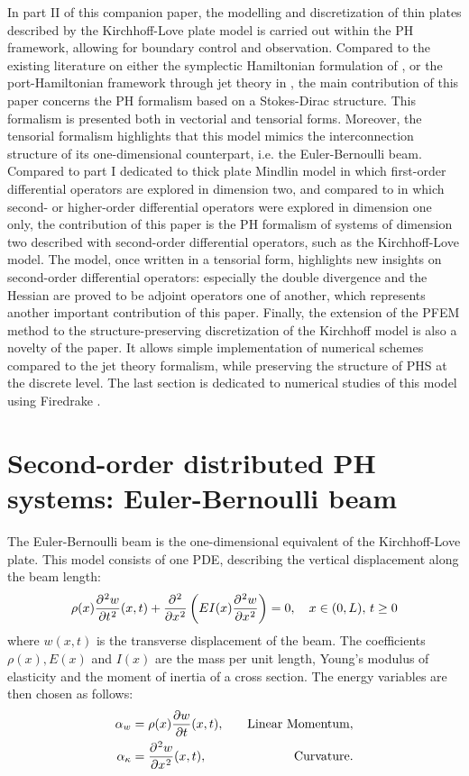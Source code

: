 \documentclass[preprint,12pt]{elsarticle}
\begin{document}
In part II of this companion paper, the modelling and discretization of thin plates described by the Kirchhoff-Love plate model is carried out within the PH framework, allowing for boundary control and observation. Compared to the existing literature on either the symplectic Hamiltonian formulation of  \cite{LI2016984,LI2018310}, or the port-Hamiltonian framework through jet theory in {\cite{jetMin,jetKirchh}}, the main contribution of this paper concerns the PH formalism based on a Stokes-Dirac structure. This formalism is presented both in vectorial and tensorial forms.  Moreover, the tensorial formalism \cite[Chapter~16]{Grinfield} highlights that this model mimics the interconnection structure of its one-dimensional counterpart, i.e. the Euler-Bernoulli beam. Compared to part I dedicated to thick plate Mindlin model in which first-order differential operators are explored in dimension two, and compared to \cite{LeGorrec2005} in which second-  or higher-order differential operators were explored in dimension one only, the contribution of this paper is the PH formalism of systems of dimension two described with second-order  differential operators, such as the Kirchhoff-Love  model. The model, once written in a tensorial form, highlights new insights on second-order differential operators: especially the double divergence and the Hessian are proved to be adjoint operators one of another, which represents another important contribution of this paper.
Finally, the extension of the PFEM method  to the structure-preserving discretization of the Kirchhoff model  is also a novelty of the paper. It allows simple implementation of numerical schemes compared to the jet theory formalism, while preserving the structure of PHS at the discrete level. {The last section is dedicated to numerical studies of this model using Firedrake \cite{firedrake}.}

\section{Second-order distributed PH systems: Euler-Bernoulli beam}	
The Euler-Bernoulli beam is the one-dimensional equivalent of the Kirchhoff-Love plate.  This model consists of one PDE, describing the vertical displacement along the beam length:
\begin{equation}
\rho(x) \diffp[2]{w}{t}(x,t) + \displaystyle \diffp[2]{}{x} \left( EI(x) \diffp[2]{w}{x} \right) = 0, \quad x \in (0,L),\, t \ge 0 
\end{equation}
where ${w}(x,t)$ is the transverse displacement of the beam. The coefficients $\rho(x), E(x)$ and $I(x)$  are the mass per unit length, Young's modulus of elasticity and the moment of inertia of a cross section. The energy variables are then chosen as follows:
\begin{equation}
\begin{aligned}
\alpha_{w} &= \rho(x) \diffp{w}{t}(x,t),  &\quad \text{Linear Momentum},\\
\alpha_{\kappa} &= \diffp[2]{w}{x}(x,t), &\quad \text{Curvature}. \\
\end{aligned}
\end{equation}
\end{document}
